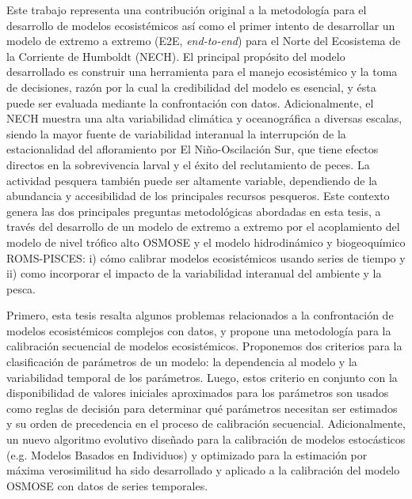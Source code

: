 Este trabajo representa una contribución original a la metodología para el desarrollo de modelos ecosistémicos así como el primer intento de desarrollar un modelo de extremo a extremo (E2E, \emph{end-to-end}) para el Norte del Ecosistema de la Corriente de Humboldt (NECH). El principal propósito del modelo desarrollado es construir una herramienta para el manejo ecosistémico y la toma de decisiones, razón por la cual la credibilidad del modelo es esencial, y ésta puede ser evaluada mediante la confrontación con datos. Adicionalmente, el NECH muestra una alta variabilidad climática y oceanográfica a diversas escalas, siendo la mayor fuente de variabilidad interanual la interrupción de la estacionalidad del afloramiento por El Niño-Oscilación Sur, que tiene efectos directos en la sobrevivencia larval y el éxito del reclutamiento de peces. La actividad pesquera también puede ser altamente variable, dependiendo de la abundancia y accesibilidad de los principales recursos pesqueros. Este contexto genera las dos principales preguntas metodológicas abordadas en esta tesis, a través del desarrollo de un modelo de extremo a extremo por el acoplamiento del modelo de nivel trófico alto OSMOSE y el modelo hidrodinámico y biogeoquímico ROMS-PISCES: i) cómo calibrar modelos ecosistémicos usando series de tiempo y ii) como incorporar el impacto de la variabilidad interanual del ambiente y la pesca.

Primero, esta tesis resalta algunos problemas relacionados a la confrontación de modelos ecosistémicos complejos con datos, y propone una metodología para la calibración secuencial de modelos ecosistémicos. Proponemos dos criterios para la clasificación de parámetros de un modelo: la dependencia al modelo y la variabilidad temporal de los parámetros. Luego, estos criterio en conjunto con la disponibilidad de valores iniciales aproximados para los parámetros son usados como reglas de decisión para determinar qué parámetros necesitan ser estimados y su orden de precedencia en el proceso de calibración secuencial. Adicionalmente, un nuevo algoritmo evolutivo diseñado para la calibración de modelos estocásticos (e.g. Modelos Basados en Individuos) y optimizado para la estimación por máxima verosimilitud ha sido desarrollado y aplicado a la calibración del modelo OSMOSE con datos de series temporales. 


